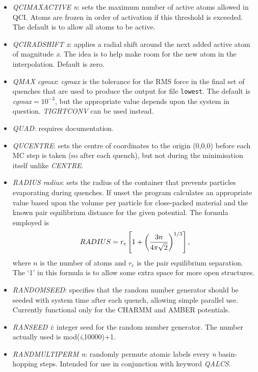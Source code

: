 \documentclass[12pt,a4paper,dvips]{article}
\begin{document}
\begin{itemize}
\item {\it QCIMAXACTIVE n}: sets the maximum number of active atoms allowed in QCI.
Atoms are frozen in order of activation if this threshold is exceeded. 
The default is to allow all atoms to be active.

\item {\it QCIRADSHIFT x}: applies a radial shift around the next added active atom of
magnitude {\it x}. The idea is to help make room for the new atom in the interpolation.
Default is zero.

\item {\it QMAX cgmax\/}: {\it cgmax\/} is the tolerance for the 
RMS force in the final set of quenches that are used to produce
the output for file {\tt lowest}. The default is 
{\it cgmax\/}$=10^{-3}$, but the appropriate value depends upon the system in question.
{\it TIGHTCONV} can be used instead.

\item {\it QUAD\/}: requires documentation.

\item {\it QUCENTRE\/}: sets the centre of coordinates to the origin (0,0,0) before each MC step is taken (so after each quench), but not during the minimisation itself unlike {\it CENTRE}. 

\item {\it RADIUS radius\/}: sets the radius of the container that prevents particles
evaporating during quenches. If unset the program calculates an appropriate value
based upon the volume per particle for close-packed material and the known pair
equilibrium distance for the given potential. The formula employed is
$$  RADIUS=r_e\left[1 + \left(3 n \over 4\pi\sqrt{2}\right)^{1/3}\right], $$
where $n$ is the number of atoms and $r_e$ is the pair equilibrium
separation.\cite{kittel76} The `1' in this formula is to allow some extra space for
more open structures.

\item {\it RANDOMSEED\/}: specifies that the random number generator should be seeded with system time after each quench, allowing simple parallel use. Currently functional only for the CHARMM and AMBER potentials.

\item {\it RANSEED i\/}: integer seed for the random number generator. The number actually used is mod({\it i\/},10000)+1.

\item{\it RANDMULTIPERM n\/}: randomly permute atomic labels every {\it n\/} basin-hopping steps. Intended for use in conjunction with keyword {\it QALCS\/}. 


\end{itemize}
\end{document}
